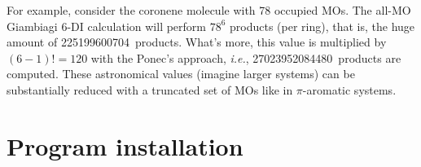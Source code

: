 \documentclass[a4paper,11pt,openany]{memoir}
\begin{document}
For example, consider the coronene molecule with 78 occupied \acp{MO}. The all-\ac{MO} Giambiagi 6-\ac{DI} calculation will perform $78^6$ products (per ring), that is, the huge amount of \SI{225199600704}{products}. What's more, this value is multiplied by $(6-1)!=120$ with the Ponec's approach, \emph{i.e.}, \SI{27023952084480}{products} are computed. These astronomical values (imagine larger systems) can be substantially reduced with a truncated set of \acp{MO} like in $\pi$-aromatic systems.

\chapter{Program installation}
\end{document}
